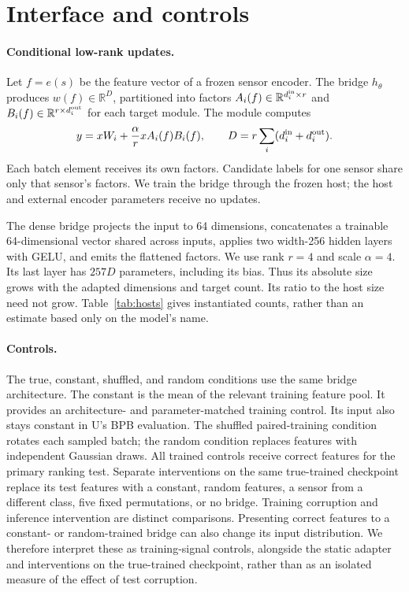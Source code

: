 \documentclass[11pt]{article}
\begin{document}
\section{Interface and controls}
\label{sec:method}
\paragraph{Conditional low-rank updates.}
Let $f=e(s)$ be the feature vector of a frozen sensor encoder. The bridge
$h_\theta$ produces $w(f)\in\mathbb{R}^{D}$, partitioned into factors
$A_i(f)\in\mathbb{R}^{d_i^{\rm in}\times r}$ and
$B_i(f)\in\mathbb{R}^{r\times d_i^{\rm out}}$ for each target module. The module computes
\[
 y=xW_i+\frac{\alpha}{r}xA_i(f)B_i(f),\qquad
 D=r\sum_i(d_i^{\rm in}+d_i^{\rm out}).
\]
Each batch element receives its own factors. Candidate labels for one sensor
share only that sensor's factors. We train the bridge through the frozen host;
the host and external encoder parameters receive no updates.

The dense bridge projects the input to 64 dimensions, concatenates a trainable
64-dimensional vector shared across inputs, applies two width-256 hidden layers
with GELU, and emits the flattened factors. We use rank $r=4$ and scale $\alpha=4$.
Its last layer has $257D$ parameters, including its bias. Thus its absolute size
grows with the adapted dimensions and target count. Its ratio to the host size need not grow.
Table~\ref{tab:hosts} gives instantiated counts, rather than an estimate based
only on the model's name.

\paragraph{Controls.}
The true, constant, shuffled, and random conditions use the same bridge
architecture. The constant is the mean of the relevant training feature pool.
It provides an architecture- and parameter-matched training control. Its input
also stays constant in U's BPB evaluation. The shuffled paired-training condition rotates each sampled batch;
the random condition replaces features with independent Gaussian draws. All
trained controls receive correct features for the primary ranking test.
Separate interventions on the same true-trained checkpoint replace its test
features with a constant, random features, a sensor from a different class,
five fixed permutations, or no bridge. Training corruption and inference
intervention are distinct comparisons.
Presenting correct features to a constant- or random-trained bridge can also
change its input distribution. We therefore interpret these as training-signal
controls, alongside the static adapter and interventions on the true-trained
checkpoint, rather than as an isolated measure of the effect of test corruption.
\end{document}
